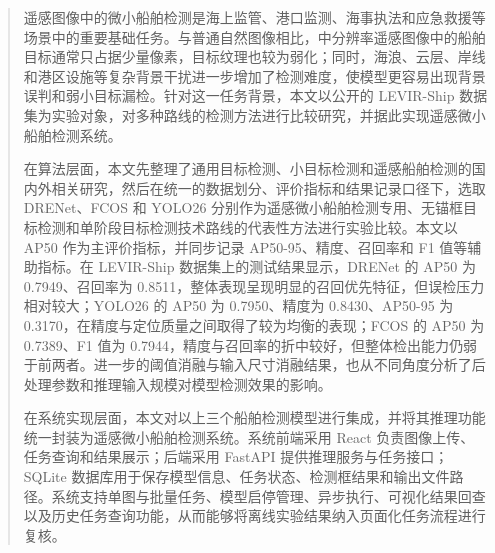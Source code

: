 \newcommand{\keywordsCn}[1][遥感图像；微小船舶检测；目标检测；检测系统；模型评估]{#1}
\begin{abstract}
    遥感图像中的微小船舶检测是海上监管、港口监测、海事执法和应急救援等场景中的重要基础任务。与普通自然图像相比，中分辨率遥感图像中的船舶目标通常只占据少量像素，目标纹理也较为弱化；同时，海浪、云层、岸线和港区设施等复杂背景干扰进一步增加了检测难度，使模型更容易出现背景误判和弱小目标漏检。针对这一任务背景，本文以公开的 LEVIR-Ship 数据集为实验对象，对多种路线的检测方法进行比较研究，并据此实现遥感微小船舶检测系统。

    在算法层面，本文先整理了通用目标检测、小目标检测和遥感船舶检测的国内外相关研究，然后在统一的数据划分、评价指标和结果记录口径下，选取 DRENet、FCOS 和 YOLO26 分别作为遥感微小船舶检测专用、无锚框目标检测和单阶段目标检测技术路线的代表性方法进行实验比较。本文以 AP50 作为主评价指标，并同步记录 AP50-95、精度、召回率和 F1 值等辅助指标。在 LEVIR-Ship 数据集上的测试结果显示，DRENet 的 AP50 为 0.7949、召回率为 0.8511，整体表现呈现明显的召回优先特征，但误检压力相对较大；YOLO26 的 AP50 为 0.7950、精度为 0.8430、AP50-95 为 0.3170，在精度与定位质量之间取得了较为均衡的表现；FCOS 的 AP50 为 0.7389、F1 值为 0.7944，精度与召回率的折中较好，但整体检出能力仍弱于前两者。进一步的阈值消融与输入尺寸消融结果，也从不同角度分析了后处理参数和推理输入规模对模型检测效果的影响。

    在系统实现层面，本文对以上三个船舶检测模型进行集成，并将其推理功能统一封装为遥感微小船舶检测系统。系统前端采用 React 负责图像上传、任务查询和结果展示；后端采用 FastAPI 提供推理服务与任务接口；SQLite 数据库用于保存模型信息、任务状态、检测框结果和输出文件路径。系统支持单图与批量任务、模型启停管理、异步执行、可视化结果回查以及历史任务查询功能，从而能够将离线实验结果纳入页面化任务流程进行复核。
\end{abstract}

